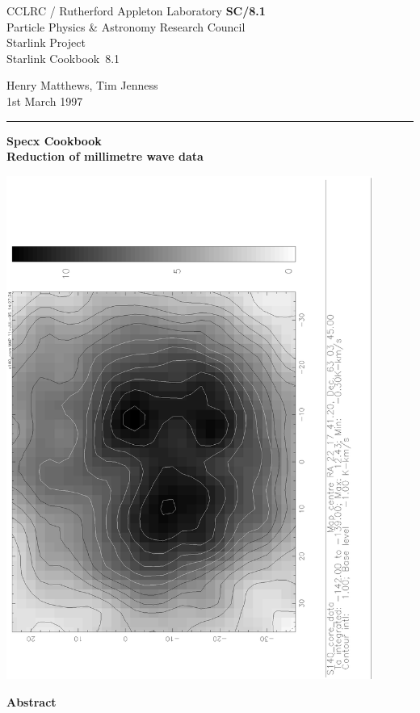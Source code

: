 \documentclass[11pt,twoside]{article}
\newcommand{\stardoccategory}  {Starlink Cookbook}
\newcommand{\stardocinitials}  {SC}
\newcommand{\stardocnumber}    {8.1}
\newcommand{\stardocauthors}   {Henry Matthews, Tim Jenness}
\newcommand{\stardocdate}      {1st March 1997}
\newcommand{\stardoctitle}     {Specx Cookbook \\[2ex]
                                Reduction of millimetre wave data}
\newcommand{\stardocversion}   {[software-version]}
\newcommand{\stardocmanual}    {[manual-type]}
\newcommand{\stardocname}{\stardocinitials /\stardocnumber}
\newenvironment{latexonly}{}{}
\begin{document}
\thispagestyle{empty}

\begin{latexonly}
   CCLRC / {\sc Rutherford Appleton Laboratory} \hfill {\bf \stardocname}\\
   {\large Particle Physics \& Astronomy Research Council}\\
   {\large Starlink Project\\}
   {\large \stardoccategory\ \stardocnumber}
   \begin{flushright}
   \stardocauthors\\
   \stardocdate
   \end{flushright}
   \vspace{-4mm}
   \rule{\textwidth}{0.5mm}
   \vspace{5mm}
   \begin{center}
   {\Huge\bf  \stardoctitle \\ [2.5ex]}
   \end{center}
   \vspace{5mm}

   \begin{center}
   \includegraphics[angle=-90,width=120mm]{sc8_gray.ps}
   \end{center}


   \vspace{10mm}
   \begin{center}
      {\Large\bf Abstract}
   \end{center}
\end{latexonly}
\end{document}
